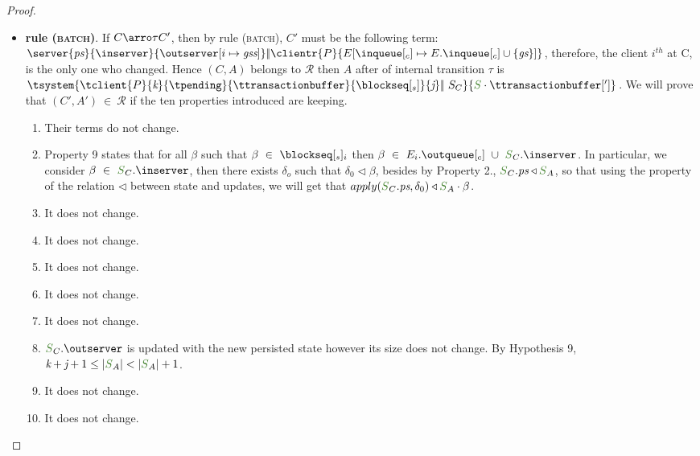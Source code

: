 \begin{proof}
\begin{itemize}
\begin{itemize}
				
						\item {\bf rule (\textsc{batch})}. If $C \arroi{\tau} C'$, then by rule (\textsc{\footnotesize{batch}}), $C'$ must be the following term: $\server{\state}{\inserver}{\update{\outserver}{i}{\gss}} \bigpar 
		\clientr{P}{\update{E}{\inclient}{E.\inclient \cup \{\gs\}}}$, therefore, the client $i^{th}$ at C, is the only one who changed. Hence	$(C,A)$ belongs to $\mathcal{R}$ then $A$ after of internal transition $\tau$ is $\tsystem{\tclient{\tprogram}{\tknown}{\tpending}{\ttransactionbuffer}{\tsent}{\treceivebuffer}\bigpar\ S_C}{\queuemessage \cdot \tsenthead}$. We will prove that $(C',A') \ \in \ \mathcal{R}$ if the ten properties introduced are keeping.	
				\begin{enumerate}
						\item Their terms do not change.
						\item Property 9 states that for all $\beta$ such that $\beta \ \in \ \tsent_i$ then $\beta \ \in \ E_{i}.\outclient \ \cup \ \queuemessage_C.\inserver$. In particular, we consider $\beta \ \in \ \queuemessage_C.\inserver$, then there exists $\delta_o$ such that $\delta_0 \triangleleft \beta$, besides by Property 2., $\queuemessage_C.\state \triangleleft \queuemessage_A$, so that using the property of the relation $\triangleleft$ between state and updates, we will get that $apply(\queuemessage_C.\state,\delta_0) \triangleleft \queuemessage_A \cdot \beta$.
							\item It does not change.
							\item It does not change.
							\item It does not change.
							\item It does not change.
							\item It does not change.
							\item $\queuemessage_C.\outserver$ is updated with the new persisted state however its size does not change. By Hypothesis 9, $\tknown + \treceivebuffer + 1 \leq |\queuemessage_A| < |\queuemessage_A| + 1$.
							\item It does not change.
							\item It does not change.

						\end{enumerate}
		

				
			\end{itemize}
		\end{itemize}
		
\end{proof}
